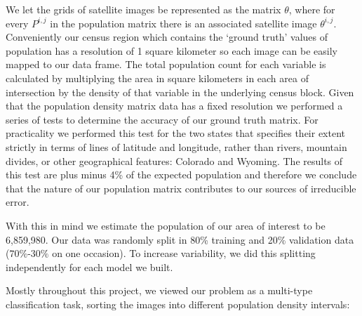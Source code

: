 \documentclass{article}
\begin{document}
We let the grids of satellite images be represented as the matrix $\theta$, where for every $P^{i,j}$  in the population matrix there is an associated satellite image $\theta^{i,j}$. Conveniently our census region which contains the ‘ground truth’ values of population has a resolution of 1 square kilometer so each image can be easily mapped to our data frame. The total population count for each variable is calculated by multiplying the area in square kilometers in each area of intersection by the density of that variable in the underlying census block. Given that the population density matrix data has a fixed resolution we performed a series of tests to determine the accuracy of our ground truth matrix. For practicality we performed this test for the two states that specifies their extent strictly in terms of lines of latitude and longitude, rather than rivers, mountain divides, or other geographical features: Colorado and Wyoming. The results of this test are plus minus 4\% of the expected population and therefore we conclude that the nature of our population matrix contributes to our sources of irreducible error.

With this in mind we estimate the population of our area of interest to be 6,859,980. Our data was randomly split in 80\% training and 20\% validation data ($70\%$-$30\%$ on one occasion). To increase variability, we did this splitting independently for each model we built.

\newpage
Mostly throughout this project, we viewed our problem as a multi-type classification task, sorting the images into different population density intervals:
\end{document}
